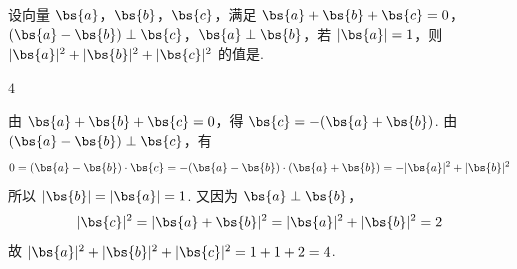 \begin{problem}
设向量 \(\bs{a}\)，\(\bs{b}\)，\(\bs{c}\)，满足 \(\bs{a} + \bs{b} + \bs{c} = 0\)，\((\bs{a} - \bs{b}) \perp \bs{c}\)，\(\bs{a} \perp \bs{b}\)，若 \(|\bs{a}| = 1\)，则 \(|\bs{a}|^2 + |\bs{b}|^2 + |\bs{c}|^2\) 的值是\fillinblank{}.

\begin{answer}
\(4\)
\end{answer}

\begin{solution}
由 \(\bs{a}+\bs{b}+\bs{c}=0\)，得 \(\bs{c}=-(\bs{a}+\bs{b})\). 由 \((\bs{a}-\bs{b})\perp\bs{c}\)，有
\[
0=(\bs{a}-\bs{b})\cdot\bs{c}=-(\bs{a}-\bs{b})\cdot(\bs{a}+\bs{b})=-|\bs{a}|^2+|\bs{b}|^2
\]
所以 \(|\bs{b}|=|\bs{a}|=1\). 又因为 \(\bs{a}\perp\bs{b}\)，
\[
|\bs{c}|^2=|\bs{a}+\bs{b}|^2=|\bs{a}|^2+|\bs{b}|^2=2
\]
故 \(|\bs{a}|^2+|\bs{b}|^2+|\bs{c}|^2=1+1+2=4\).
\end{solution}
\end{problem}

